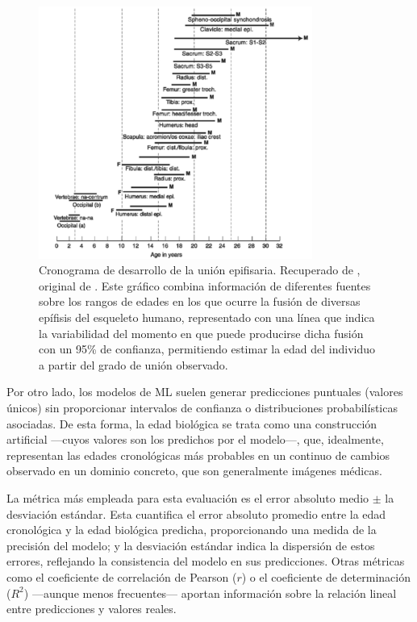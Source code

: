 \begin{figure}[htbp]
    \centering
    \includegraphics[width=0.8\textwidth]{capitulos/cap_03/imagenes/range_values_epiphyselial.png}
    \caption[
        Cronograma de desarrollo de la unión epifisaria. Recuperado de \cite{byers2023}, original de \cite{buikstra1994}.
    ]{
        Cronograma de desarrollo de la unión epifisaria. Recuperado de \cite{byers2023}, original de \cite{buikstra1994}. 
        Este gráfico combina información de diferentes fuentes sobre los rangos de edades en los que ocurre la fusión de diversas epífisis del esqueleto humano, representado con una línea que indica la variabilidad del momento en que puede producirse dicha fusión con un 95\% de confianza, permitiendo estimar la edad del individuo a partir del grado de unión observado.
    }
    \label{fig:range_values_epiphyselial}
\end{figure}

Por otro lado, los modelos de ML suelen generar predicciones puntuales (valores únicos) sin proporcionar intervalos de confianza o distribuciones probabilísticas asociadas. De esta forma, la edad biológica se trata como una construcción artificial ---cuyos valores son los predichos por el modelo---, que, idealmente, representan las edades cronológicas más probables en un continuo de cambios observado en un dominio concreto, que son generalmente imágenes médicas. 

La métrica más empleada para esta evaluación es el error absoluto medio $\pm$ la desviación estándar. Esta cuantifica el error absoluto promedio entre la edad cronológica y la edad biológica predicha, proporcionando una medida de la precisión del modelo; y la desviación estándar indica la dispersión de estos errores, reflejando la consistencia del modelo en sus predicciones. Otras métricas como el coeficiente de correlación de Pearson ($r$) o el coeficiente de determinación ($R^2$) ---aunque menos frecuentes--- aportan información sobre la relación lineal entre predicciones y valores reales.

